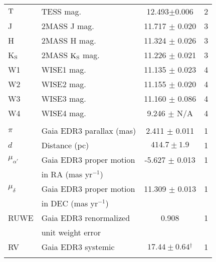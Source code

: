 \begin{table*}
\begin{tabular}{llcc}
${\rm T}$\dotfill     & TESS mag.\dotfill     & 12.493$\pm$0.006 & 2\\
J\dotfill			& 2MASS J mag.\dotfill & 11.717  $\pm$ 0.020	& 3	\\
H\dotfill			& 2MASS H mag.\dotfill & 11.324 $\pm$ 0.026	    &  3	\\
K$_{\rm S}$\dotfill			& 2MASS ${\rm K_S}$ mag.\dotfill & 11.226 $\pm$ 0.021 &  3	\\
W1\dotfill		& WISE1 mag.\dotfill & 11.135 $\pm$ 0.023 & 4	\\
W2\dotfill		& WISE2 mag.\dotfill & 11.155 $\pm$ 0.020 &  4 \\
W3\dotfill		& WISE3 mag.\dotfill & 11.160 $\pm$ 0.086& 4	\\
W4\dotfill		& WISE4 mag.\dotfill & 9.246 $\pm$ N/A &  4	\\
\\
$\pi$\dotfill & Gaia EDR3 parallax (mas) \dotfill & 2.411 $\pm$ 0.011 &  1 \\
$d$\dotfill & Distance (pc)\dotfill & $414.7 \pm 1.9$ & 1 \\
$\mu_{\alpha'}$\dotfill		& Gaia EDR3 proper motion\dotfill & -5.627 $\pm$ 0.013 & 1 \\
                    & \hspace{3pt} in RA (mas yr$^{-1}$)	&  \\
$\mu_{\delta}$\dotfill		& Gaia EDR3 proper motion\dotfill 	&  11.309 $\pm$ 0.013 &  1 \\
                    & \hspace{3pt} in DEC (mas yr$^{-1}$) &  \\
RUWE\dotfill		& Gaia EDR3 renormalized\dotfill 	&  0.908 &  1 \\
                    & \hspace{3pt} unit weight error &  \\
RV\dotfill & Gaia EDR3 systemic \hspace{9pt}\dotfill  & $17.44 \pm 0.64$$^{\dagger}$ & 1 \\
$$
\end{tabular}
\end{table*}
